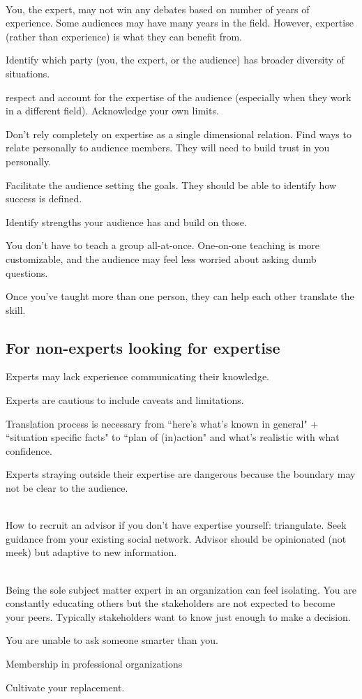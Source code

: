 \ \\

You, the expert, may not win any debates based on number of years of experience. Some audiences may have many years in the field. However, expertise (rather than experience) is what they can benefit from. 

Identify which party (you, the expert, or the audience) has broader diversity of situations.

respect and account for the expertise of the audience (especially when they work in a different field). Acknowledge your own limits.

Don't rely completely on expertise as a single dimensional relation. Find ways to relate personally to audience members. They will need to build trust in you personally.

Facilitate the audience setting the goals. They should be able to identify how success is defined.

Identify strengths your audience has and build on those.

You don't have to teach a group all-at-once. One-on-one teaching is more customizable, and the audience may feel less worried about asking dumb questions.

Once you've taught more than one person, they can help each other translate the skill. 


\subsection*{For non-experts looking for expertise}

Experts may lack experience communicating their knowledge. 

Experts are cautious to include caveats and limitations.

Translation process is necessary from ``here's what's known in general" + ``situation specific facts" to ``plan of (in)action" and what's realistic with what confidence. 

Experts straying outside their expertise are dangerous because the boundary may not be clear to the audience.

\ \\

How to recruit an advisor if you don't have expertise yourself: triangulate. Seek guidance from your existing social network. Advisor should be opinionated (not meek) but adaptive to new information. 

\ \\

Being the sole subject matter expert in an organization can feel isolating. You are constantly educating others but the stakeholders are not expected to become your peers. Typically stakeholders want to know just enough to make a decision. 

You are unable to ask someone smarter than you. 

Membership in professional organizations

Cultivate your replacement. 